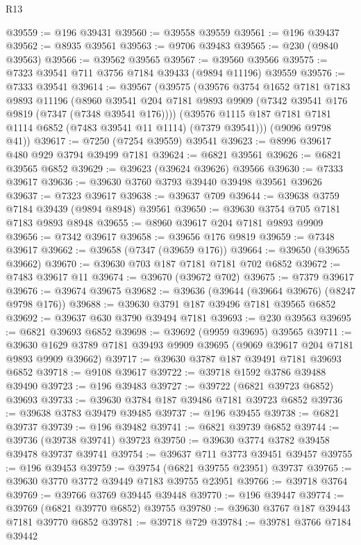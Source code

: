 \begin{lexlean}{R13}
\begin{coremodule}
@39559 := @196 @39431
@39560 := @39558 @39559
@39561 := @196 @39437
@39562 := @8935 @39561
@39563 := @9706 @39483
@39565 := @230 (@9840 @39563)
@39566 := @39562 @39565
@39567 := @39560 @39566
@39575 := @7323 @39541 @711 @3756 @7184 @39433 (@9894 @11196) @39559
@39576 := @7333 @39541
@39614 := @39567
    (@39575
      (@39576
        @3754
        @1652
        @7181
        @7183
        @9893
        @11196
        (@8960 @39541 @204 @7181 @9893 @9909 (@7342 @39541 @176 @9819 (@7347 (@7348 @39541 @176))))
        (@39576 @1115 @187 @7181 @7181 @1114 @6852 (@7483 @39541 @11 @1114) (@7379 @39541)))
      (@9096 @9798 @41))
@39617 := @7250 (@7254 @39559) @39541
@39623 := @8996 @39617 @480 @929 @3794 @39499 @7181
@39624 := @6821 @39561
@39626 := @6821 @39565 @6852
@39629 := @39623 (@39624 @39626) @39566
@39630 := @7333 @39617
@39636 := @39630 @3760 @3793 @39440 @39498 @39561 @39626
@39637 := @7323 @39617
@39638 := @39637 @709
@39644 := @39638 @3759 @7184 @39439 (@9894 @8948) @39561
@39650 := @39630 @3754 @705 @7181 @7183 @9893 @8948
@39655 := @8960 @39617 @204 @7181 @9893 @9909
@39656 := @7342 @39617
@39658 := @39656 @176 @9819
@39659 := @7348 @39617
@39662 := @39658 (@7347 (@39659 @176))
@39664 := @39650 (@39655 @39662)
@39670 := @39630 @703 @187 @7181 @7181 @702 @6852
@39672 := @7483 @39617 @11
@39674 := @39670 (@39672 @702)
@39675 := @7379 @39617
@39676 := @39674 @39675
@39682 := @39636 (@39644 (@39664 @39676) (@8247 @9798 @176))
@39688 := @39630 @3791 @187 @39496 @7181 @39565 @6852
@39692 := @39637 @630 @3790 @39494 @7181
@39693 := @230 @39563
@39695 := @6821 @39693 @6852
@39698 := @39692 (@9959 @39695) @39565
@39711 := @39630 @1629 @3789 @7181 @39493 @9909 @39695 (@9069 @39617 @204 @7181 @9893 @9909 @39662)
@39717 := @39630 @3787 @187 @39491 @7181 @39693 @6852
@39718 := @9108 @39617
@39722 := @39718 @1592 @3786 @39488 @39490
@39723 := @196 @39483
@39727 := @39722 (@6821 @39723 @6852) @39693
@39733 := @39630 @3784 @187 @39486 @7181 @39723 @6852
@39736 := @39638 @3783 @39479 @39485
@39737 := @196 @39455
@39738 := @6821 @39737
@39739 := @196 @39482
@39741 := @6821 @39739 @6852
@39744 := @39736 (@39738 @39741) @39723
@39750 := @39630 @3774 @3782 @39458 @39478 @39737 @39741
@39754 := @39637 @711 @3773 @39451 @39457
@39755 := @196 @39453
@39759 := @39754 (@6821 @39755 @23951) @39737
@39765 := @39630 @3770 @3772 @39449 @7183 @39755 @23951
@39766 := @39718 @3764
@39769 := @39766 @3769 @39445 @39448
@39770 := @196 @39447
@39774 := @39769 (@6821 @39770 @6852) @39755
@39780 := @39630 @3767 @187 @39443 @7181 @39770 @6852
@39781 := @39718 @729
@39784 := @39781 @3766 @7184 @39442

\end{coremodule}
\end{lexlean}
